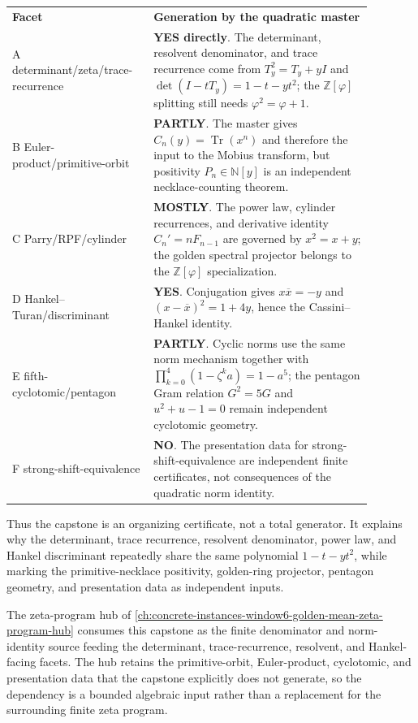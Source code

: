 \begin{center}
\begin{tabular}{p{0.32\linewidth}p{0.56\linewidth}}
\textbf{Facet} & \textbf{Generation by the quadratic master} \\
A determinant/zeta/trace-recurrence & \textbf{YES directly}. The determinant, resolvent denominator, and trace recurrence come from $T_y^2=T_y+yI$ and $\det(I-tT_y)=1-t-yt^2$; the $\mathbb Z[\varphi]$ splitting still needs $\varphi^2=\varphi+1$. \\
B Euler-product/primitive-orbit & \textbf{PARTLY}. The master gives $C_n(y)=\operatorname{Tr}(x^n)$ and therefore the input to the Mobius transform, but positivity $P_n\in\mathbb N[y]$ is an independent necklace-counting theorem. \\
C Parry/RPF/cylinder & \textbf{MOSTLY}. The power law, cylinder recurrences, and derivative identity $C_n'=nF_{n-1}$ are governed by $x^2=x+y$; the golden spectral projector belongs to the $\mathbb Z[\varphi]$ specialization. \\
D Hankel--Turan/discriminant & \textbf{YES}. Conjugation gives $x\overline{x}=-y$ and $(x-\overline{x})^2=1+4y$, hence the Cassini--Hankel identity. \\
E fifth-cyclotomic/pentagon & \textbf{PARTLY}. Cyclic norms use the same norm mechanism together with $\prod_{k=0}^{4}(1-\zeta^k a)=1-a^5$; the pentagon Gram relation $G^2=5G$ and $u^2+u-1=0$ remain independent cyclotomic geometry. \\
F strong-shift-equivalence & \textbf{NO}. The presentation data for strong-shift-equivalence are independent finite certificates, not consequences of the quadratic norm identity. \\
\end{tabular}
\end{center}

Thus the capstone is an organizing certificate, not a total generator. It explains why the determinant, trace recurrence, resolvent denominator, power law, and Hankel discriminant repeatedly share the same polynomial $1-t-yt^2$, while marking the primitive-necklace positivity, golden-ring projector, pentagon geometry, and presentation data as independent inputs.

The zeta-program hub of \autoref{ch:concrete-instances-window6-golden-mean-zeta-program-hub} consumes this capstone as the finite denominator and norm-identity source feeding the determinant, trace-recurrence, resolvent, and Hankel-facing facets. The hub retains the primitive-orbit, Euler-product, cyclotomic, and presentation data that the capstone explicitly does not generate, so the dependency is a bounded algebraic input rather than a replacement for the surrounding finite zeta program.

